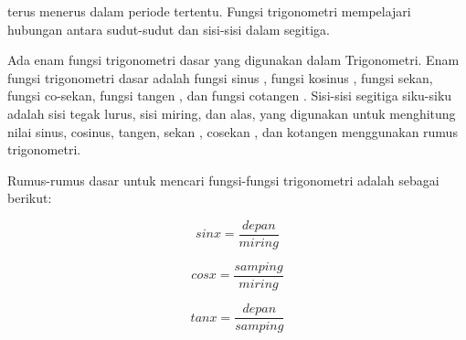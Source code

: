 \documentclass[a4paper,10pt]{article}
\begin{document}
\begin{eulernotebook}
\begin{eulercomment}
\begin{eulercomment}
\begin{eulercomment}
\begin{eulercomment}
\begin{eulercomment}
\begin{eulercomment}
\begin{eulercomment}
\begin{eulercomment}
\begin{eulercomment}
\begin{eulercomment}
\begin{eulercomment}
\begin{eulercomment}
\begin{eulercomment}
\begin{eulercomment}
\begin{eulercomment}
\begin{eulercomment}
\begin{eulercomment}
\begin{eulercomment}
\begin{eulercomment}
\begin{eulercomment}
\begin{eulercomment}
\begin{eulercomment}
\begin{eulercomment}
\begin{eulercomment}
\begin{eulercomment}
\begin{eulercomment}
\begin{eulercomment}
\begin{eulercomment}
\begin{eulercomment}
\begin{eulercomment}
\begin{eulercomment}
\begin{eulercomment}
\begin{eulercomment}
\begin{eulercomment}
\begin{eulercomment}
\begin{eulercomment}
\begin{eulercomment}
\begin{eulercomment}
\begin{eulercomment}
\begin{eulercomment}
\begin{eulercomment}
\begin{eulercomment}
\begin{eulercomment}
\begin{eulercomment}
\begin{eulercomment}
\begin{eulercomment}
\begin{eulercomment}
\begin{eulercomment}
\begin{eulercomment}
terus menerus dalam periode tertentu. Fungsi trigonometri mempelajari
hubungan antara sudut-sudut dan sisi-sisi dalam segitiga.

Ada enam fungsi trigonometri dasar yang digunakan dalam Trigonometri.
Enam fungsi trigonometri dasar adalah fungsi sinus , fungsi kosinus ,
fungsi sekan, fungsi co-sekan, fungsi tangen , dan fungsi cotangen .
Sisi-sisi segitiga siku-siku adalah sisi tegak lurus, sisi miring, dan
alas, yang digunakan untuk menghitung nilai sinus, cosinus, tangen,
sekan , cosekan , dan kotangen menggunakan rumus trigonometri.

\end{eulercomment}
\begin{eulercomment}
Rumus-rumus dasar untuk mencari fungsi-fungsi trigonometri adalah
sebagai berikut:\\
\end{eulercomment}
\begin{eulerformula}
\[
sin x = \frac{depan}{miring}
\]
\end{eulerformula}
\begin{eulerformula}
\[
cos x = \frac{samping}{miring}
\]
\end{eulerformula}
\begin{eulerformula}
\[
tan x = \frac{depan}{samping}
\]

\end{eulerformula}
\end{eulercomment}
\end{eulercomment}
\end{eulercomment}
\end{eulercomment}
\end{eulercomment}
\end{eulercomment}
\end{eulercomment}
\end{eulercomment}
\end{eulercomment}
\end{eulercomment}
\end{eulercomment}
\end{eulercomment}
\end{eulercomment}
\end{eulercomment}
\end{eulercomment}
\end{eulercomment}
\end{eulercomment}
\end{eulercomment}
\end{eulercomment}
\end{eulercomment}
\end{eulercomment}
\end{eulercomment}
\end{eulercomment}
\end{eulercomment}
\end{eulercomment}
\end{eulercomment}
\end{eulercomment}
\end{eulercomment}
\end{eulercomment}
\end{eulercomment}
\end{eulercomment}
\end{eulercomment}
\end{eulercomment}
\end{eulercomment}
\end{eulercomment}
\end{eulercomment}
\end{eulercomment}
\end{eulercomment}
\end{eulercomment}
\end{eulercomment}
\end{eulercomment}
\end{eulercomment}
\end{eulercomment}
\end{eulercomment}
\end{eulercomment}
\end{eulercomment}
\end{eulercomment}
\end{eulercomment}
\end{eulernotebook}
\end{document}
